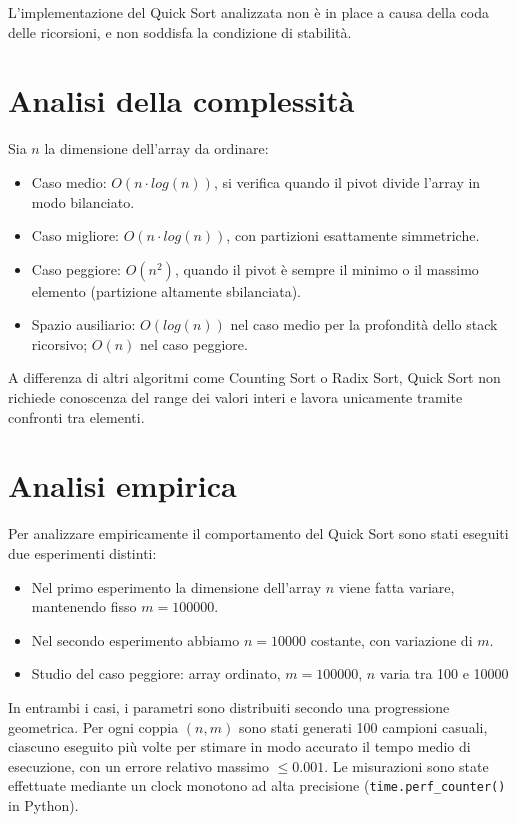 \documentclass[a4paper, 12pt, oneside]{book}
\begin{document}
\noindent
L'implementazione del Quick Sort analizzata non è in place a causa della coda delle ricorsioni, e non soddisfa la condizione di stabilità.

\section{Analisi della complessità}

Sia \(n\) la dimensione dell'array da ordinare:

\begin{itemize}
    \item Caso medio: \(O(n \cdot log(n))\), si verifica quando il pivot divide l'array in modo bilanciato.
    \item Caso migliore: \(O(n \cdot log(n))\), con partizioni esattamente simmetriche.
    \item Caso peggiore: \(O(n^2)\), quando il pivot è sempre il minimo o il massimo elemento (partizione altamente sbilanciata).
    \item Spazio ausiliario: \(O(log(n))\) nel caso medio per la profondità dello stack ricorsivo; \(O(n)\) nel caso peggiore.
\end{itemize}

\noindent A differenza di altri algoritmi come Counting Sort o Radix Sort, Quick Sort non richiede conoscenza del range dei valori interi e lavora unicamente tramite confronti tra elementi.

\section{Analisi empirica}

Per analizzare empiricamente il comportamento del Quick Sort sono stati eseguiti due esperimenti distinti:

\begin{itemize}
    \item Nel primo esperimento la dimensione dell'array \(n\) viene fatta variare, mantenendo fisso \(m = 100000\).
    \item Nel secondo esperimento abbiamo \(n = 10000\) costante, con variazione di \(m\).
    \item Studio del caso peggiore: array ordinato, \(m = 100000\), \(n\) varia tra 100 e 10000
\end{itemize}

\noindent In entrambi i casi, i parametri sono distribuiti secondo una progressione geometrica.
Per ogni coppia \((n, m)\) sono stati generati 100 campioni casuali, ciascuno eseguito più volte per stimare in modo accurato il tempo medio di esecuzione, con un errore relativo massimo \(\leq 0.001\).
Le misurazioni sono state effettuate mediante un clock monotono ad alta precisione (\texttt{time.perf\_counter()} in Python). \\
\end{document}
